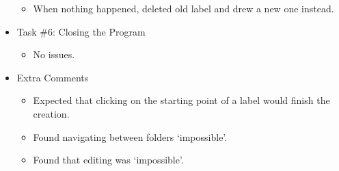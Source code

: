 \documentclass[11pt,twocolumn]{article}
\begin{document}
\begin{itemize}
\begin{itemize}
\item When nothing happened, deleted old label and drew a new one instead.
\end{itemize}
\item Task \#6: Closing the Program
\begin{itemize}
\item No issues.
\end{itemize}
\item Extra Comments
\begin{itemize}
\item Expected that clicking on the starting point of a label would finish the creation.
\item Found navigating between folders `impossible'.
\item Found that editing was `impossible'.
\end{itemize}
\end{itemize}
\end{document}
